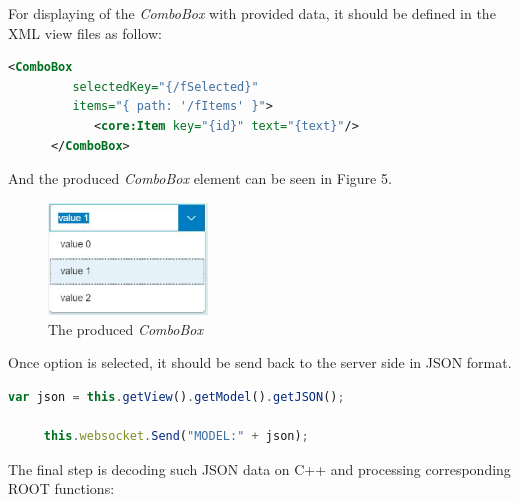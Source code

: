 \documentclass[a4paper]{jpconf}
\begin{document}
For displaying of the \textit{ComboBox} with provided data, it should be defined in the XML view files as follow:

\begin{lstlisting}[language=XML,numbers=none]
      <ComboBox 
         selectedKey="{/fSelected}"
         items="{ path: '/fItems' }">
            <core:Item key="{id}" text="{text}"/>
      </ComboBox>
\end{lstlisting}

And the produced \textit{ComboBox} element can be seen in Figure 5.

\begin{figure}[h]
  \begin{center}
    \includegraphics[width=10pc]{testCombo.eps}\hspace{2pc}%
  \end{center}
  \centering
\begin{minipage}[b]{20pc}\caption{\label{label}The produced \textit{ComboBox}}
\end{minipage}
\end{figure}

Once option is selected, it should be send back to the server side in JSON format.

\begin{lstlisting}[language=JavaScript,numbers=none]
     var json = this.getView().getModel().getJSON();

     this.websocket.Send("MODEL:" + json);
\end{lstlisting}

The final step is decoding such JSON data on C++ and processing corresponding ROOT functions:
\end{document}
